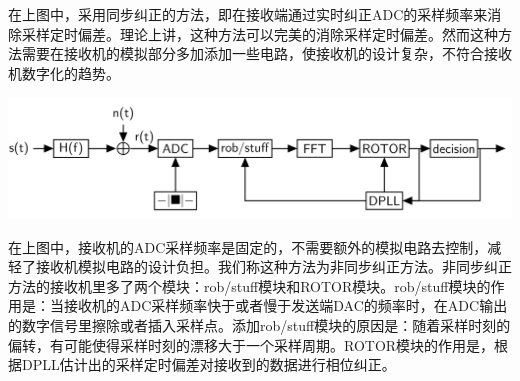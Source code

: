 \documentclass[10pt,a4paper,UTF8]{article}
\begin{document}
在上图中，采用同步纠正的方法，即在接收端通过实时纠正ADC的采样频率来消除采样定时偏差。理论上讲，这种方法可以完美的消除采样定时偏差。然而这种方法需要在接收机的模拟部分多加添加一些电路，使接收机的设计复杂，不符合接收机数字化的趋势。


\begin{center}
\includegraphics[width=.9\linewidth]{../../img/communication_protocol/20171018samplingTimingB.png}
\end{center}

在上图中，接收机的ADC采样频率是固定的，不需要额外的模拟电路去控制，减轻了接收机模拟电路的设计负担。我们称这种方法为非同步纠正方法。非同步纠正方法的接收机里多了两个模块：rob/stuff模块和ROTOR模块。rob/stuff模块的作用是：当接收机的ADC采样频率快于或者慢于发送端DAC的频率时，在ADC输出的数字信号里擦除或者插入采样点。添加rob/stuff模块的原因是：随着采样时刻的偏转，有可能使得采样时刻的漂移大于一个采样周期。ROTOR模块的作用是，根据DPLL估计出的采样定时偏差对接收到的数据进行相位纠正。
\end{document}
